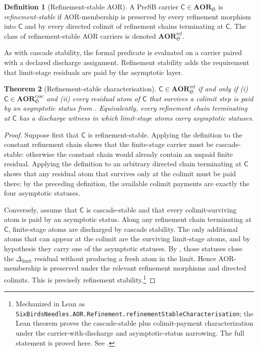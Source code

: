 \documentclass[11pt]{article}
\newcommand{\AOR}{\mathbf{AOR}}
\newcommand{\CascadeStableAOR}{\mathbf{AOR}^{\mathrm{casc}}}
\newcommand{\RefStableAOR}{\mathbf{AOR}^{\mathrm{ref}}}
\newcommand{\Dlimit}{\Delta_{\mathrm{limit}}}
\newtheorem{theorem}{Theorem}[section]
\theoremstyle{definition}
\newtheorem{definition}[theorem]{Definition}
\begin{document}
\begin{definition}[Refinement-stable AOR]\label{def:aor:refinement-stable-aor}
A PreSB carrier $\mathsf C\in\AOR_{\mathfrak S}$ is
\emph{refinement-stable} if AOR-membership is preserved by every
refinement morphism into $\mathsf C$ and by every directed colimit of
refinement chains terminating at $\mathsf C$.  The class of
refinement-stable AOR carriers is denoted
$\RefStableAOR_{\mathfrak S}$.
\end{definition}

As with cascade stability, the formal predicate is evaluated on a carrier
paired with a declared discharge assignment.  Refinement stability adds the
requirement that limit-stage residuals are paid by the asymptotic layer.

\begin{theorem}[Refinement-stable characterisation]\label{thm:aor:refinement-stable-characterisation}
$\mathsf C\in\RefStableAOR_{\mathfrak S}$ if and only if (i)
$\mathsf C\in\CascadeStableAOR_{\mathfrak S}$ and (ii) every residual
atom of $\mathsf C$ that survives a colimit step is paid by an
asymptotic status from .
Equivalently, every refinement chain terminating at $\mathsf C$ has a
discharge witness in which limit-stage atoms carry asymptotic
statuses.
\end{theorem}

\begin{proof}
Suppose first that \(\mathsf C\) is refinement-stable.  Applying the
definition to the constant refinement chain shows that the finite-stage
carrier must be cascade-stable: otherwise the constant chain would already
contain an unpaid finite residual.  Applying the definition to an arbitrary
directed chain terminating at \(\mathsf C\) shows that any residual atom that
survives only at the colimit must be paid there; by the preceding definition,
the available colimit payments are exactly the four asymptotic statuses.

Conversely, assume that \(\mathsf C\) is cascade-stable and that every
colimit-surviving atom is paid by an asymptotic status.  Along any refinement
chain terminating at \(\mathsf C\), finite-stage atoms are discharged by
cascade stability.  The only additional atoms that can appear at the colimit
are the surviving limit-stage atoms, and by hypothesis they carry one of the
asymptotic statuses.  By , those statuses
close the \(\Dlimit\) residual without producing a fresh atom in the limit.
Hence AOR-membership is preserved under the relevant refinement morphisms and
directed colimits.  This is precisely refinement stability.\footnote{Mechanized in Lean as \texttt{SixBirdsNeedles.AOR.Refinement.refinementStableCharacterisation}; the Lean theorem proves the cascade-stable plus colimit-payment characterization under the carrier-with-discharge and asymptotic-status narrowing. The full statement is proved here. See .}
\end{proof}
\end{document}
